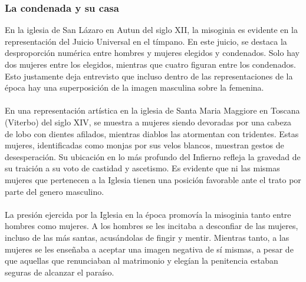 \documentclass{report}
\begin{document}
\subsubsection{La condenada y su casa}
En la iglesia de San Lázaro en Autun del siglo XII, la misoginia es evidente en la representación del Juicio Universal en el tímpano. En este juicio, se destaca la desproporción numérica entre hombres y mujeres elegidos y condenados. Solo hay dos mujeres entre los elegidos, mientras que cuatro figuran entre los condenados. Esto justamente deja entrevisto que incluso dentro de las representaciones de la época hay una superposición de la imagen masculina sobre la femenina.
\\\\
En una representación artística en la iglesia de Santa Maria Maggiore en Toscana (Viterbo) del siglo XIV, se muestra a mujeres siendo devoradas por una cabeza de lobo con dientes afilados, mientras diablos las atormentan con tridentes. Estas mujeres, identificadas como monjas por sus velos blancos, muestran gestos de desesperación. Su ubicación en lo más profundo del Infierno refleja la gravedad de su traición a su voto de castidad y ascetismo. Es evidente que ni las mismas mujeres que pertenecen a la Iglesia tienen una posición favorable ante el trato por parte del genero masculino. 
\\\\
La presión ejercida por la Iglesia en la época promovía la misoginia tanto entre hombres como mujeres. A los hombres se les incitaba a desconfiar de las mujeres, incluso de las más santas, acusándolas de fingir y mentir. Mientras tanto, a las mujeres se les enseñaba a aceptar una imagen negativa de sí mismas, a pesar de que aquellas que renunciaban al matrimonio y elegían la penitencia estaban seguras de alcanzar el paraíso.
\end{document}
